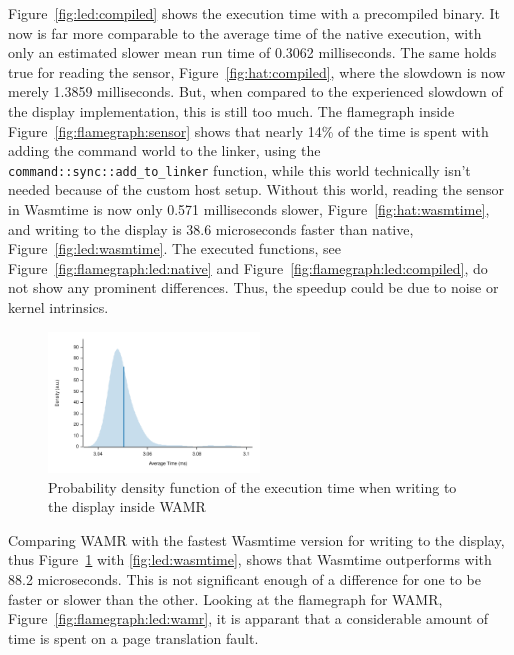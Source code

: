 Figure~\ref{fig:led:compiled} shows the execution time with a precompiled binary. It now is far more comparable to the average time of the native execution, with only an estimated slower mean run time of 0.3062 milliseconds. The same holds true for reading the sensor, Figure~\ref{fig:hat:compiled}, where the slowdown is now merely 1.3859 milliseconds. But, when compared to the experienced slowdown of the display implementation, this is still too much. The flamegraph inside Figure~\ref{fig:flamegraph:sensor} shows that nearly 14\% of the time is spent with adding the command world to the linker, using the \texttt{command::sync::add\_to\_linker} function, while this world technically isn't needed because of the custom host setup. Without this world, reading the sensor in Wasmtime is now only 0.571 milliseconds slower, Figure~\ref{fig:hat:wasmtime}, and writing to the display is 38.6 microseconds faster than native, Figure~\ref{fig:led:wasmtime}. The executed functions, see Figure~\ref{fig:flamegraph:led:native} and Figure~\ref{fig:flamegraph:led:compiled}, do not show any prominent differences. Thus, the speedup could be due to noise or kernel intrinsics.

\begin{figure}
  \centering
  \includegraphics[width=0.5\textwidth]{figures/wamr_led}
  \caption{Probability density function of the execution time when writing to the display inside WAMR}
  \label{fig:led:wamr}
\end{figure}


Comparing WAMR with the fastest Wasmtime version for writing to the display, thus Figure~\ref{fig:led:wamr} with \ref{fig:led:wasmtime}, shows that Wasmtime outperforms with 88.2 microseconds. This is not significant enough of a difference for one to be faster or slower than the other. Looking at the flamegraph for WAMR, Figure~\ref{fig:flamegraph:led:wamr}, it is apparant that a considerable amount of time is spent on a page translation fault. 

